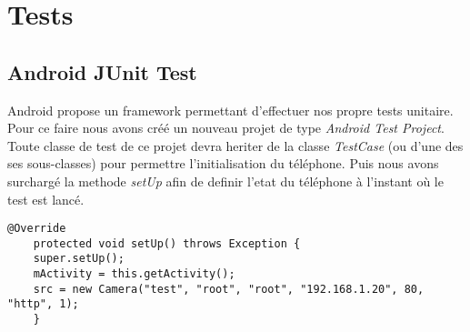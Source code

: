 \chapter{Tests}
\section{Android JUnit Test}
Android propose un framework permettant d'effectuer nos propre tests unitaire.
Pour ce faire nous avons créé un nouveau projet de type \textit{Android Test Project}. Toute classe de test de ce projet devra heriter de la classe \textit{TestCase} (ou d'une des ses sous-classes) pour permettre l'initialisation du téléphone. Puis nous avons surchargé la methode \textit{setUp} afin de definir l'etat du téléphone à l'instant où le test est lancé.
\begin{lstlisting}[format=JAVA]
    @Override
    protected void setUp() throws Exception {
	super.setUp();
	mActivity = this.getActivity();
	src = new Camera("test", "root", "root", "192.168.1.20", 80, "http", 1);
    }
\end{lstlisting}

